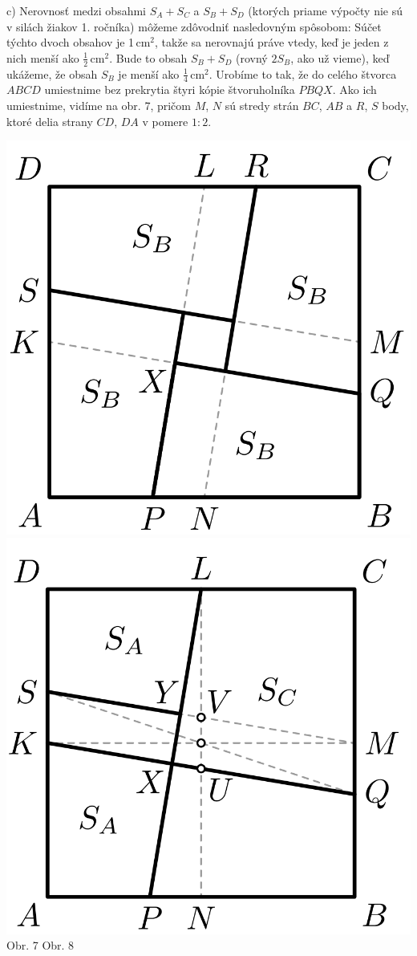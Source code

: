 \documentclass[11pt,a4paper,oneside,final]{book}
\begin{document}
c) Nerovnosť medzi obsahmi $S_A + S_C$ a $S_B + S_D$ (ktorých priame výpočty nie sú v silách žiakov 1. ročníka) môžeme zdôvodniť nasledovným spôsobom: Súčet týchto dvoch obsahov je 1\,cm$^2$, takže sa nerovnajú práve vtedy, keď je jeden z nich menší ako $\frac{1}{2}$\,cm$^2$. Bude to obsah $S_B +S_D$ (rovný $2S_B$, ako už vieme), keď ukážeme, že obsah $S_B$ je menší ako $\frac{1}{4}$\,cm$^2$. Urobíme to tak, že do celého štvorca $ABCD$ umiestnime bez prekrytia štyri kópie štvoruholníka $PBQX$. Ako ich umiestnime, vidíme na obr. 7, pričom $M$, $N$ sú stredy strán $BC$, $AB$ a $R$, $S$ body, ktoré delia strany $CD$, $DA$ v pomere $1 : 2$.
\begin{center}
\includegraphics[scale=0.3]{60D32} \includegraphics[scale=0.3]{60D33}\\

Obr. 7 \hspace{140pt} Obr. 8
\end{center}
\end{document}
